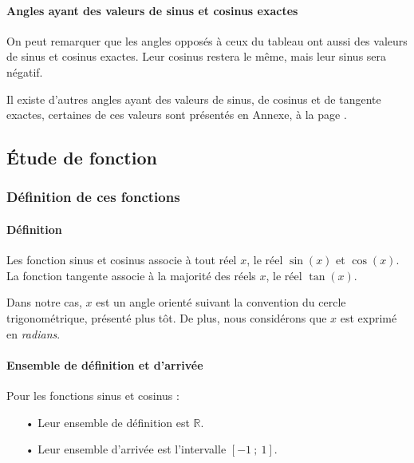 \documentclass[a4paper]{article}
\begin{document}
			\paragraph*{Angles ayant des valeurs de sinus et cosinus exactes}
			\phantom{r}

			On peut remarquer que les angles opposés à ceux du tableau ont aussi 
			des valeurs de sinus et cosinus exactes.
			Leur cosinus restera le même, mais leur sinus sera négatif. 
			
			Il existe d'autres angles ayant des valeurs de sinus, de cosinus et de tangente exactes,
			certaines de ces valeurs sont présentés en Annexe, à la page \pageref{valeur_remarquable_trigo}.

		\subsection{Étude de fonction}
			\subsubsection{Définition de ces fonctions}
				\paragraph*{Définition}
					\phantom{r}

					Les fonction sinus et cosinus associe à tout réel $x$, le réel $\sin(x)$ et $\cos(x)$.
					La fonction tangente associe à la majorité des réels $x$, le réel $\tan(x)$.				
					
					Dans notre cas, $x$ est un angle orienté suivant la convention du cercle trigonométrique, présenté plus tôt.
					De plus, nous considérons que $x$ est exprimé en \emph{radians}.

				\paragraph*{Ensemble de définition et d'arrivée}
					\phantom{r}

					Pour les fonctions sinus et cosinus :
					\begin{itemize}
						\item [•] Leur ensemble de définition est $\mathbb{R}$.
						\item [•] Leur ensemble d'arrivée est l'intervalle $[-1~;~1]$.
					\end{itemize}

					\vspace{2mm}
\end{document}
